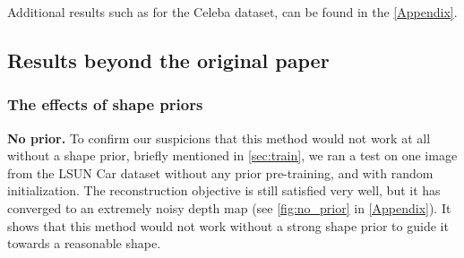 Additional results such as for the Celeba dataset, can be found in the \autoref{Appendix}.

\subsection{Results beyond the original paper}

\subsubsection{The effects of shape priors}
\label{sec:results_priors}
\textbf{No prior.} To confirm our suspicions that this method would not work at all without a shape prior, briefly mentioned in \ref{sec:train}, we ran a test on one image from the LSUN Car dataset without any prior pre-training, and with random initialization. The reconstruction objective is still satisfied very well, but it has converged to an extremely noisy depth map (see \autoref{fig:no_prior} in \autoref{Appendix}). It shows that this method would not work without a strong shape prior to guide it towards a reasonable shape.


